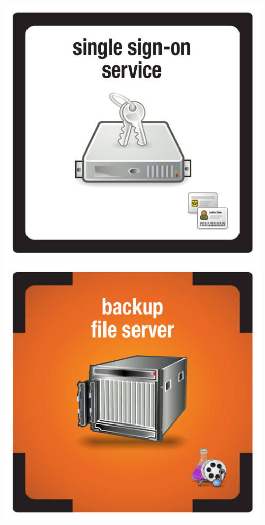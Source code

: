 \documentclass{letter}
\begin{document}
\includegraphics{tiles/node_sso_service}
\includegraphics{tiles/node_backup_file_server_compromised} \\
\end{document}
